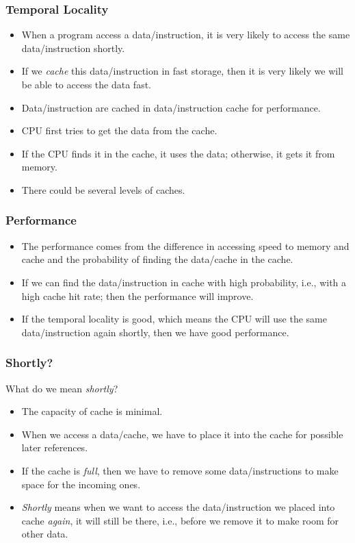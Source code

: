 \documentclass{beamer}
\begin{document}
\begin{CJK}{UTF8}{bsmi}
\begin{frame}
\frametitle{Temporal Locality} 
\begin{itemize}
\item When a program access a data/instruction, it is very likely to access the same data/instruction shortly.
\item If we {\em cache} this data/instruction in fast storage, then it is very likely we will be able to access the data fast.
\item Data/instruction are cached in data/instruction cache for performance.
\item CPU first tries to get the data from the cache.
\item If the CPU finds it in the cache, it uses the data; otherwise, it gets it from memory.
\item There could be several levels of caches.
\end{itemize}
\end{frame}

\begin{frame}
\frametitle{Performance}
\begin{itemize}
\item The performance comes from the difference in accessing speed to memory and cache and the probability of finding the data/cache in the cache.
\item If we can find the data/instruction in cache with high probability, i.e., with a high cache hit rate; then the performance will improve.
\item If the temporal locality is good, which means the CPU will use the same data/instruction again shortly, then we have good performance.
\end{itemize}
\end{frame}

\begin{frame}
\frametitle{Shortly?}  
What do we mean {\em shortly}?
\begin{itemize}
\item The capacity of cache is minimal.
\item When we access a data/cache, we have to place it into the cache for possible later references.
\item If the cache is {\em full}, then we have to remove some data/instructions to make space for the incoming ones.
\item {\em Shortly} means when we want to access the data/instruction we placed into cache {\em again}, it will still be there, i.e., before we remove it to make room for other data.
\end{itemize}
\end{frame}


\end{CJK}
\end{document}
